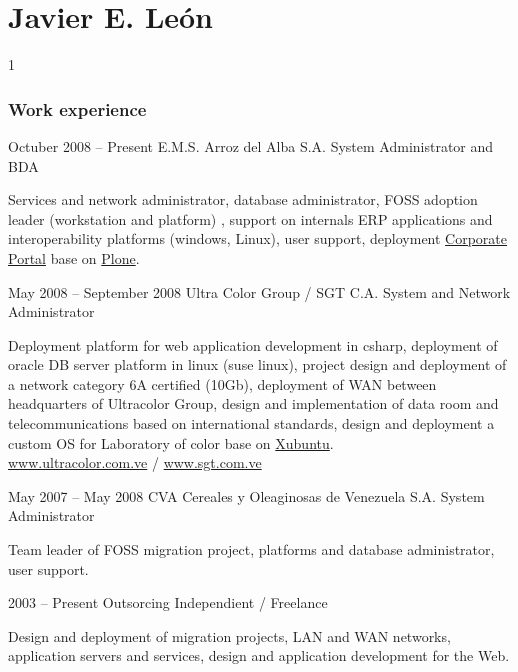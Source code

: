 \documentclass{tccv}
\begin{document}
\part{Javier E. Le\'on}
     {1}
 
\section{Work experience}

\begin{experiencia}

\item{Octuber 2008 -- Present}
     {E.M.S. Arroz del Alba S.A.}
     {System Administrator and BDA}

Services and network administrator, database administrator, FOSS adoption leader (workstation and platform) , support on internals ERP applications and interoperability platforms (windows, Linux), user support, deployment \href{http://www.arrozdelalba.gob.ve/}{Corporate Portal} base on \href{http://www.plone.org/}{Plone}.

\item{May 2008 -- September 2008}
     { Ultra Color Group / SGT C.A.}
     {System and Network Administrator}

Deployment platform for web application development in csharp, deployment of oracle DB server platform in linux (suse linux), project design and deployment of a network category 6A certified (10Gb), deployment of WAN between headquarters of Ultracolor Group, design and implementation of data room and telecommunications based on international standards, design and deployment a custom OS for Laboratory of color base on \href{http://www.xubuntu.com/}{Xubuntu}.\\
\href{http://www.ultracolor.com.ve}{www.ultracolor.com.ve} / \href{http://www.sgt.com.ve/}{www.sgt.com.ve} 

\item{May 2007 -- May 2008}
     {CVA Cereales y Oleaginosas de Venezuela S.A.}
     {System Administrator}

Team leader of FOSS migration project, platforms and database administrator, user support.

\item{2003 -- Present}
     {Outsorcing}
     {Independient / Freelance}

Design and deployment of migration projects, LAN and WAN networks, application servers and services, design and application development for the Web.

\end{experiencia}
\end{document}
